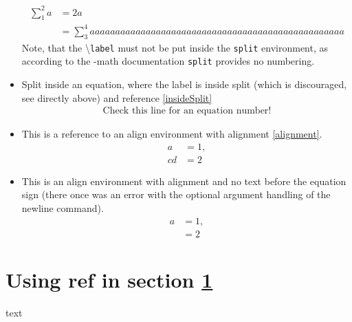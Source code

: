 \documentclass{article}
\def\ifcleveref#1{#1}%
\def\ifcleveref#1{}%
\begin{document}
\begin{itemize}
			\begin{equation}\label{splitLong}
				\begin{split}
					\sum_1^2 a &= 2a\\
							&= \sum_3^4 aaaaaaaaaaaaaaaaaaaaaaaaaaaaaaaaaaaaaaaaaaaaaaaaaa
				\end{split}
			\end{equation}
			Note, that the \textbackslash\texttt{label} must not be put inside the \texttt{split} environment, as according to the \AmS-math documentation \texttt{split} provides no numbering.
		\item Split inside an equation, where the label is inside split (which is discouraged, see directly above) and reference \ref{insideSplit}
			\begin{equation}
				\begin{split}
					\label{insideSplit}
					\text{Check this line for an equation number!}
				\end{split}
			\end{equation}
		\item This is a reference to an align environment with alignment \ref{alignment}.
			\begin{align}%
				a &= 1,\label{alignment}\\%
				cd &= 2\label{rowTwo}%
			\end{align}%
		\item This is an align environment with alignment and no text before the equation sign (there once was an error with the optional argument handling of the newline command).
			\begin{align}
				a &= 1,\label{eq:a}\\
				&= 2\label{eq:b}
			\end{align}
	\end{itemize}
	\section{Using ref in section \ref{i1}}\label{i1} text
	\ifcleveref{
		\section{Using cref in \texorpdfstring{\cref{i2}}{Section \ref{i2}}}\label{i2} text
		\begin{figure}
			\caption{Ref 2: \cref{i2} and \ref{i2}}
		\end{figure}
	}
\tableofcontents
\listoffigures
\end{document}
